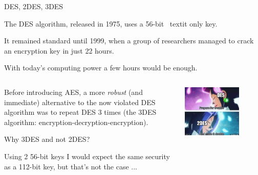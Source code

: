\documentclass[handout, xcolor=dvipsnames,aspectratio=169]{beamer}
\begin{document}
\begin{frame}{DES, 2DES, 3DES}

  The DES algorithm, released in 1975, uses a 56-bit \ textit {only} key.

  It remained standard until 1999, when a group of researchers managed to crack an encryption key in just 22 hours.

  With today's computing power a few hours would be enough.

  \begin{columns}
    \begin{column}{0.5\textwidth}
      \medskip

      Before introducing AES, a more \textit{robust} (and immediate) alternative to the now violated DES algorithm was to repeat DES 3 times (the 3DES algorithm: encryption-decryption-encryption).

      \medskip

      Why 3DES and not 2DES?

      \medskip

      Using 2 56-bit keys I would expect the same security as a 112-bit key, but that's not the case ...
    
    \end{column}
    \begin{column}{0.5\textwidth}  %
      \begin{center}
        \includegraphics[width=0.7\textwidth]{img/2des}
      \end{center}
    \end{column}
  \end{columns}


\end{frame}
\end{document}
